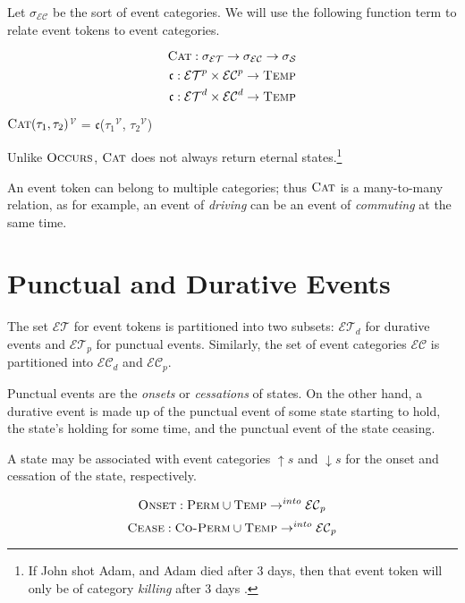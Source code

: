 Let $\sigma_\mathcal{EC}$ be the sort of event categories. We will use the following function term to relate event tokens to event categories.

\[
    \textsc{Cat}: \sigma_\mathcal{ET} \to \sigma_\mathcal{EC} \to \sigma_\mathcal{S}
\]
$$\mathfrak{c} : \mathcal{ET}^p \times \mathcal{EC}^p \to \textsc{Temp}$$
$$\mathfrak{c} : \mathcal{ET}^d \times \mathcal{EC}^d \to \textsc{Temp}$$

\textlbrackdbl $\textsc{Cat}(\tau_1, \tau_2)$\textrbrackdbl$^{\mathcal{V}}$ = $\mathfrak{c}$(\textlbrackdbl $\tau_1$\textrbrackdbl$^{\mathcal{V}}$, \textlbrackdbl $\tau_2$\textrbrackdbl$^{\mathcal{V}}$)

Unlike $\textsc{Occurs}$, $\textsc{Cat}$ does not always return eternal states.\footnote{If John shot Adam, and Adam died after 3 days, then that event token will only be of category \textit{killing} after 3 days \cite{timeofakilling}.}

An event token can belong to multiple categories; thus $\textsc{Cat}$ is a many-to-many relation, as for example, an event of
\textit{driving} can be an event of \textit{commuting} at the same time.

\section{Punctual and Durative Events}

The set $\mathcal{ET}$ for event tokens is partitioned into two subsets: $\mathcal{ET}_d$ for durative events and $\mathcal{ET}_p$ for punctual events.
Similarly, the set of event categories $\mathcal{EC}$ is partitioned into $\mathcal{EC}_d$ and $\mathcal{EC}_p$.

Punctual events are the \textit{onsets} or \textit{cessations} of states. On the other hand, a durative event is made up
of the punctual event of some state starting to hold, the state's holding for some time, and the punctual event of the state ceasing.

A state may be associated with event categories $\uparrow s$ and $\downarrow s$ for the onset and cessation of the state, respectively.

\begin{equation}
    \textsc{Onset} : \textsc{Perm} \cup \textsc{Temp} \to^{into} \mathcal{EC}_p
\end{equation}
\begin{equation}
    \textsc{Cease} : \textsc{Co-Perm} \cup \textsc{Temp} \to^{into} \mathcal{EC}_p
\end{equation}

